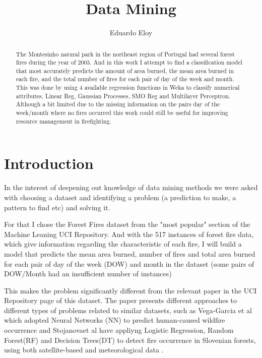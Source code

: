 \documentclass[runningheads]{llncs}
\begin{document}
\title{Data Mining}
\author{Eduardo Eloy}
\maketitle             
\begin{abstract}
The Montesinho natural park in the northeast region of Portugal had several forest fires during the year of 2003.
And in this work I attempt to find a classification model that most accurately predicts the amount of area burned, the mean area burned in each fire, and the total number of fires for each pair of day of the week and month.
This was done by using 4 available regression functions in Weka to classify numerical attributes, Linear Reg, Gaussian Processes, SMO Reg and Multilayer Perceptron.
Although a bit limited due to the missing information on the pairs day of the week/month where no fires occurred this work could still be useful for improving resource management in firefighting.

\end{abstract}

\section{Introduction}

In the interest of deepening out knowledge of data mining methods we were asked with choosing a dataset and identifying a problem (a prediction to make, a pattern to find etc) and solving it.

For that I chose the Forest Fires dataset from the "most popular" section of the Machine Leaning UCI Repository\cite{dataset}.
And with the 517 instances of forest fire data, which give information regarding the characteristic of each fire, I will build a model that predicts the mean area burned, number of fires and total area burned for each pair of day of the week (DOW) and month in the dataset (some pairs of DOW/Month had an insufficient number of instances)

This makes the problem significantly different from the relevant paper\cite{paper} in the UCI Repository page of this dataset.
The paper presents different approaches to different types of problems related to similar datasets, such as Vega-Garcia et al which adopted Neural Networks (NN)  to  predict human-caused wildfire occurrence and Stojanovaet al have appliyng Logistic Regression, Random Forest(RF) and Decision Trees(DT) to detect fire occurrence in Slovenian forests, using both satellite-based and meteorological data \cite{vega}.
\end{document}
